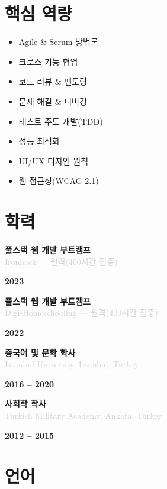 \documentclass[10pt,a4paper]{article}
\newcommand{\Education}[3]{%
  \vspace{2pt}
  \noindent
  \begin{minipage}[t]{0.70\textwidth}
    {\normalsize\textbf{\color{darkgray}#1}} \\
    \textcolor{lightgray}{\small #2}
  \end{minipage}%
  \hfill
  \begin{minipage}[t]{0.28\textwidth}
    \raggedleft
    \textcolor{mediumgray}{\small\textbf{#3}}
  \end{minipage}
  \vspace{1pt}
}
\begin{document}
\section*{핵심 역량}

\noindent
\begin{minipage}[t]{0.48\textwidth}
  \begin{itemize}
    \item Agile \& Scrum 방법론
    \item 크로스 기능 협업
    \item 코드 리뷰 \& 멘토링
    \item 문제 해결 \& 디버깅
  \end{itemize}
\end{minipage}%
\hfill
\begin{minipage}[t]{0.48\textwidth}
  \begin{itemize}
    \item 테스트 주도 개발(TDD)
    \item 성능 최적화
    \item UI/UX 디자인 원칙
    \item 웹 접근성(WCAG 2.1)
  \end{itemize}
\end{minipage}

\section*{학력}

\Education{풀스택 웹 개발 부트캠프}{Ironhack — 원격(400시간 집중)}{2023}

\Education{풀스택 웹 개발 부트캠프}{Digi-Homeschooling — 원격(400시간 집중)}{2022}

\Education{중국어 및 문학 학사}{Istanbul University, Istanbul, Turkey}{2016 -- 2020}

\Education{사회학 학사}{Turkish Military Academy, Ankara, Turkey}{2012 -- 2015}

\section*{언어}
\end{document}
